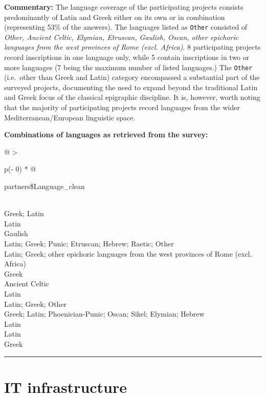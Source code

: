 \documentclass[
  12pt,
]{scrreprt}
\begin{document}
\textbf{Commentary:} The language coverage of the participating projects
consists predominantly of Latin and Greek either on its own or in
combination (representing 53\% of the answers). The languages listed as
\texttt{Other} consisted of \emph{Other, Ancient Celtic, Elymian,
Etruscan, Gaulish, Oscan, other epichoric languages from the west
provinces of Rome (excl. Africa)}. 8 participating projects record
inscriptions in one language only, while 5 contain inscriptions in two
or more languages (7 being the maximum number of listed languages.) The
\texttt{Other} (i.e.~other than Greek and Latin) category encompassed a
substantial part of the surveyed projects, documenting the need to
expand beyond the traditional Latin and Greek focus of the classical
epigraphic discipline. It is, however, worth noting that the majority of
participating projects record languages from the wider
Mediterranean/European linguistic space.

\textbf{Combinations of languages as retrieved from the survey:}

\begin{longtable}[]{@{}
  >{\raggedright\arraybackslash}p{(\columnwidth - 0\tabcolsep) * }@{}}
\toprule
\begin{minipage}[b]{\linewidth}\raggedright
partners\$Language\_clean
\end{minipage} \\
\midrule
\endhead
Greek; Latin \\
Latin \\
Gaulish \\
Latin; Greek; Punic; Etruscan; Hebrew; Raetic; Other \\
Latin; Greek; other epichoric languages from the west provinces of Rome
(excl. Africa) \\
Greek \\
Ancient Celtic \\
Latin \\
Latin; Greek; Other \\
Greek; Latin; Phoenician-Punic; Oscan; Sikel; Elymian; Hebrew \\
Latin \\
Latin \\
Greek \\
\bottomrule
\end{longtable}

\begin{center}\rule{0.5\linewidth}{0.5pt}\end{center}

\hypertarget{it-infrastructure}{%
\section{IT infrastructure}\label{it-infrastructure}}
\end{document}
